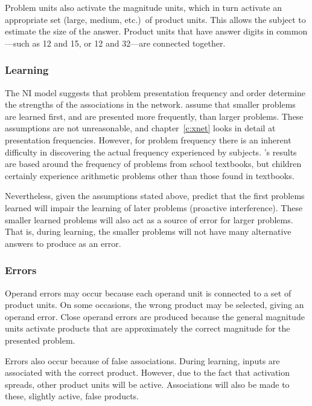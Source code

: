 Problem units also activate the magnitude units, which in turn activate an
appropriate set (large, medium, etc.)\ of product units. This allows the
subject to estimate the size of the answer.  Product units
that have answer digits in common---such as 12 and 15, or 12 and
32---are
connected together.

\subsubsection{Learning}

The NI model suggests that problem presentation frequency and order
determine the strengths of the associations in the network.
 assume that smaller problems are learned first, and are
presented more frequently, than larger problems. These assumptions are
not unreasonable, and chapter~\ref{c:xnet} looks in detail at
presentation frequencies.  However, for problem
frequency there is an inherent difficulty in discovering the actual
frequency experienced by subjects. \citeauthor{siegmult}'s results are
based around the frequency of problems from school textbooks, but
children certainly experience arithmetic problems other than those found
in textbooks.

Nevertheless, given the assumptions stated above, \citeauthor{camp85}
predict that the first problems learned will impair the learning of
later problems (proactive interference).  These smaller learned problems
will also act as a source of error for larger problems. That is, during
learning, the smaller problems will not have many alternative answers to
produce as an error.

\subsubsection{Errors}

Operand errors may occur because each operand unit is connected to a set
of product units.  On some occasions, the wrong product may be selected,
giving an operand error.  Close operand errors are produced because the
general magnitude units activate products that are approximately the
correct magnitude for the presented problem.

Errors also occur because of false associations. During learning, inputs
are associated with the correct
product.  However, due to the fact that activation spreads, other
product units will be active. Associations will also be made to these,
slightly active, false products.

